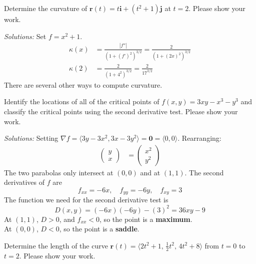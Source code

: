 \fi






\ifnum {}

\question[4] Determine the curvature of $\mathbf r(t) = t\mathbf i + (t^2+1)\mathbf j$ at $t=2$. Please show your work. 

\ifnum {} {\color{DarkBlue} \textit{Solutions:} Set $f=x^2+1$. 
\begin{align*}
    \kappa(x) &= \frac{|f''|}{(1+(f')^2)^{3/2}} 
    = \frac{2}{(1 + (2x)^2)^{3/2}} \\
    \kappa(2) &= \frac{2}{(1+4^2)^{3/2}} 
    = \frac{2}{17^{3/2}} 
\end{align*}
There are several other ways to compute curvature. 
}
\else
\vspace{9cm}
\fi
\fi





\ifnum {}
\question[4] Identify the locations of all of the critical points of $f(x,y) = 3xy - x^3- y^3$ and classify the critical points using the second derivative test. Please show your work. 

\ifnum {} {\color{DarkBlue} \textit{Solutions:} Setting $\nabla f = \langle 3y - 3x^2, 3x - 3y^2 \rangle = \mathbf 0 = \langle 0,0\rangle$. Rearranging:
\begin{align}
    \begin{pmatrix} y\\x\end{pmatrix} &= \begin{pmatrix} x^2\\y^2\end{pmatrix}
\end{align}
The two parabolas only intersect at $(0,0)$ and at $(1,1)$. The second derivatives of $f$ are
$$f_{xx} = -6x, \quad f_{yy} = -6y, \quad f_{xy} = 3$$
The function we need for the second derivative test is 
$$D(x,y) = (-6x)(-6y) - (3)^2 = 36xy - 9$$
At $(1,1)$, $D>0$, and $f_{xx}<0$, so the point is a \textbf{maximum}.  \\
At $(0,0)$, $D<0$, so the point is a \textbf{saddle}.  
} 
\else
\vspace{9cm}
\fi    
\fi

\ifnum {}
\question[4] Determine the length of the curve $\mathbf r(t) = \langle 2t^2+1, \, \frac12t^2, \, 4t^2+8 \rangle$ from $t=0$ to $t=2$. Please show your work. 

